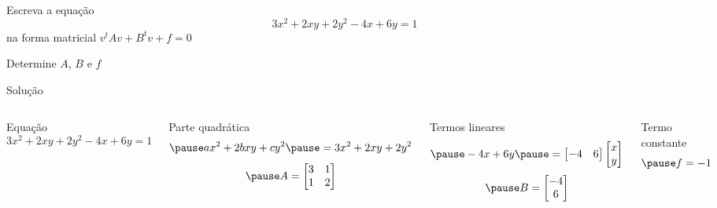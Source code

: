 \begin{question}
  Escreva a equação
  \[
    3x^2 + 2xy + 2y^2 - 4x + 6y = 1
  \]
  na forma matricial
  \(
    v^tAv + B^tv + f = 0
  \)

  \bigskip
  Determine $A$, $B$ e $f$
\end{question}

\begin{resolution}{Solução}
\begin{columns}[t]
  Equação
  \[
    3x^2 + 2xy + 2y^2 - 4x + 6y = 1
  \]

  \pause
  Parte quadrática
  \[
    \pause
    ax^2 + 2bxy + cy^2
    \pause
    = 3x^2 + 2xy + 2y^2
  \]
  \[
    \pause
    A = \begin{bmatrix}
      3 & 1 \\
      1 & 2
    \end{bmatrix}
  \]

  \pause
  Termos lineares
  \[
    \pause
    -4x + 6y
    \pause
    =
    \begin{bmatrix} -4 & 6  \end{bmatrix}
    \begin{bmatrix}  x \\ y \end{bmatrix}
  \]
  \[
    \pause
    B = \begin{bmatrix} -4 \\ 6 \end{bmatrix}
  \]

  \bigskip
  \pause
  Termo constante
  \[
    \pause
    f = -1
  \]
\end{columns}
\end{resolution}

\endinput

